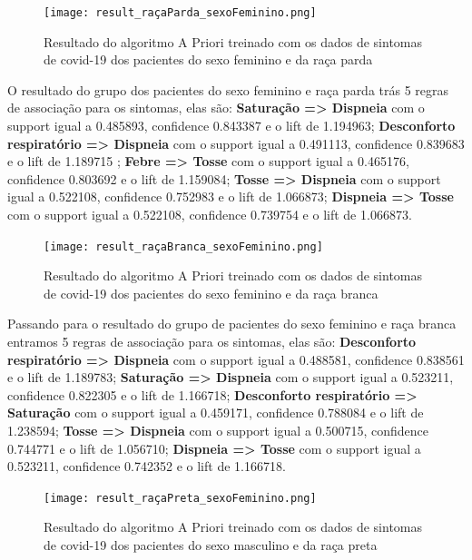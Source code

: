 \documentclass[tcc1]{uftex}
\begin{document}
\begin{itemize}
    \begin{figure}[!h]
    \centering
    \texttt{[image: result\_raçaParda\_sexoFeminino.png]} %
    \caption{Resultado do algoritmo A Priori treinado com os dados de sintomas de covid-19 dos pacientes do sexo feminino e da raça parda}
    \end{figure}
    
    O resultado do grupo dos pacientes do sexo feminino e raça parda trás 5 regras de associação para os sintomas, elas são: 
    \textbf{Saturação => Dispneia} com o support igual a 0.485893, confidence 0.843387 e o lift de 1.194963;
    \textbf{Desconforto respiratório => Dispneia} com o support igual a 0.491113, confidence 0.839683 e o lift de 1.189715 ; 
    \textbf{Febre => Tosse} com o support igual a 0.465176, confidence 0.803692 e o lift de 1.159084;
    \textbf{Tosse => Dispneia} com o support igual a 0.522108, confidence 0.752983 e o lift de 1.066873;
    \textbf{Dispneia => Tosse} com o support igual a 0.522108, confidence 0.739754 e o lift de 1.066873.
    
    \begin{figure}[!h]
    \centering
    \texttt{[image: result\_raçaBranca\_sexoFeminino.png]} %
    \caption{Resultado do algoritmo A Priori treinado com os dados de sintomas de covid-19 dos pacientes do sexo feminino e da raça branca}
    \end{figure}
    
    Passando para o resultado do grupo de pacientes do sexo feminino e raça branca entramos 5 regras de associação para os sintomas, elas são:
    \textbf{Desconforto respiratório => Dispneia} com o support igual a 0.488581, confidence 0.838561 e o lift de 1.189783;
    \textbf{Saturação => Dispneia} com o support igual a 0.523211, confidence 0.822305 e o lift de 1.166718; 
    \textbf{Desconforto respiratório => Saturação} com o support igual a 0.459171, confidence 0.788084 e o lift de 1.238594;
    \textbf{Tosse => Dispneia} com o support igual a 0.500715, confidence 0.744771 e o lift de 1.056710;
    \textbf{Dispneia => Tosse} com o support igual a 0.523211, confidence 0.742352 e o lift de 1.166718.
    
    \begin{figure}[!h]
    \centering
    \texttt{[image: result\_raçaPreta\_sexoFeminino.png]} %
    \caption{Resultado do algoritmo A Priori treinado com os dados de sintomas de covid-19 dos pacientes do sexo masculino e da raça preta}
    \end{figure}
    

\end{itemize}
\end{document}
